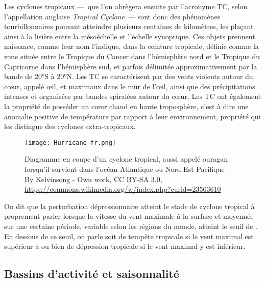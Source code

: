 \documentclass[../main.tex]{subfiles}
\begin{document}
Les cyclones tropicaux ---~que l'on abrègera ensuite par l'acronyme TC, selon l'appellation anglaise \textit{Tropical Cyclone}~--- sont donc des phénomènes
tourbillonnaires pouvant atteindre plusieurs centaines de kilomètres, les plaçant ainsi à la lisière entre la mésoéchelle et l'échelle synoptique. Ces objets
prennent naissance, comme leur nom l'indique, dans la ceinture tropicale, définie comme la zone située entre le Tropique du Cancer dans l'hémisphère nord et le
Tropique du Capricorne dans l'hémisphère sud, et parfois délimitée approximativement par la bande de \ang{20}S à \ang{20}N. Les TC se caractérisent par des
vents violents autour du cœur, appelé œil, et maximaux dans le mur de l'œil, ainsi que des précipitations intenses et organisées par bandes spiralées autour du
cœur. Les TC ont également la propriété de posséder un cœur chaud en haute troposphère, c'est à dire une anomalie positive de température par rapport à leur environnement,
propriété qui les distingue des cyclones extra-tropicaux.
%
\begin{figure}[tb]
    \centering
    \texttt{[image: Hurricane-fr.png]}
    \caption{Diagramme en coupe d'un cyclone tropical, aussi appelé ouragan lorsqu'il survient dans l'océan Atlantique ou Nord-Est Pacifique --- By Kelvinsong -
    Own work, CC BY-SA 3.0, \url{https://commons.wikimedia.org/w/index.php?curid=23563610}}
    \label{fig:diagramme_TC}
\end{figure}
%
On dit que la perturbation dépressionnaire atteint le stade de cyclone tropical à proprement parler lorsque la vitesse du vent maximale à la surface et moyennée
sur une certaine période, variable selon les régions du monde, atteint le seuil de . En dessous de ce seuil, on parle soit de tempête tropicale si le
vent maximal est supérieur à  ou bien de dépression tropicale si le vent maximal y est inférieur.

\subsection{Bassins d'activité et saisonnalité}\label{sec:bassins_saisons}
\end{document}
